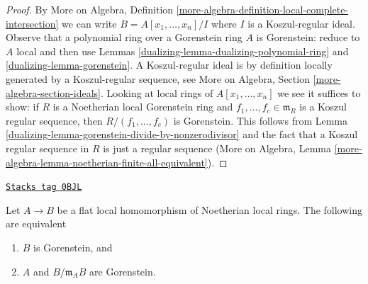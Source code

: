 \begin{proof}

By More on Algebra, Definition
\ref{more-algebra-definition-local-complete-intersection}
we can write $B = A[x_1, \ldots, x_n]/I$
where $I$ is a Koszul-regular ideal. Observe that a polynomial
ring over a Gorenstein ring $A$ is Gorenstein: reduce to
$A$ local and then use Lemmas \ref{dualizing-lemma-dualizing-polynomial-ring} and
\ref{dualizing-lemma-gorenstein}.
A Koszul-regular ideal is by definition locally generated
by a Koszul-regular sequence, see More on Algebra, Section
\ref{more-algebra-section-ideals}.
Looking at local rings of $A[x_1, \ldots, x_n]$
we see it suffices to show: if $R$ is a Noetherian local
Gorenstein ring and $f_1, \ldots, f_c \in \mathfrak m_R$
is a Koszul regular sequence, then $R/(f_1, \ldots, f_c)$ is Gorenstein.
This follows from
Lemma \ref{dualizing-lemma-gorenstein-divide-by-nonzerodivisor} and
the fact that a Koszul regular sequence in $R$ is just a
regular sequence (More on Algebra, Lemma
\ref{more-algebra-lemma-noetherian-finite-all-equivalent}).
\end{proof}

\begin{lemma}
\label{dualizing-lemma-flat-under-gorenstein}
\href{https://stacks.math.columbia.edu/tag/0BJL}{\texttt{Stacks tag 0BJL}}

Let $A \to B$ be a flat local homomorphism of Noetherian local rings.
The following are equivalent
\begin{enumerate}
\item $B$ is Gorenstein, and
\item $A$ and $B/\mathfrak m_A B$ are Gorenstein.
\end{enumerate}
\end{lemma}

